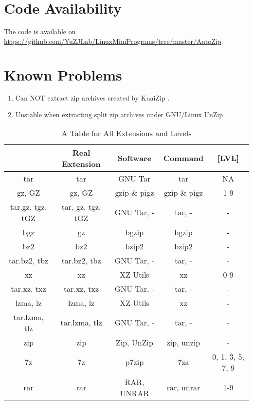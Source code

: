 \documentclass[fleqn,10pt]{SelfArx} %
\begin{document}
\section{Code Availability}
The code is available on \url{https://github.com/YuZJLab/LinuxMiniPrograms/tree/master/AutoZip}.
\section{Known Problems}
\begin{enumerate}
\item Can NOT extract zip archives created by KuaiZip \cite{KuaiZip}.
\item Unstable when extracting split zip archives under GNU/Linux UnZip \cite{UnZip}.
\end{enumerate}


\newpage
\onecolumn
\begin{table}
\centering
\begin{tabular}{|c|c|c|c|c|}
\hline\hline
[EXT] & Real Extension & Software & Command & [LVL] \\\hline\hline
tar & tar & GNU Tar & tar & NA \\\hline
gz, GZ & gz, GZ & gzip \& pigz & gzip \& pigz & 1-9 \\\hline
tar.gz, tgz, tGZ & tar, gz, tgz, tGZ & GNU Tar, - & tar, - & - \\\hline
bgz & gz & bgzip & bgzip & - \\\hline
bz2 & bz2 & bzip2 & bzip2 & - \\\hline
tar.bz2, tbz & tar.bz2, tbz & GNU Tar, - & tar, - & - \\\hline
xz & xz & XZ Utils & xz & 0-9 \\\hline
tar.xz, txz & tar.xz, txz & GNU Tar, - & tar, - & - \\\hline
lzma, lz & lzma, lz & XZ Utils & xz & - \\\hline
tar.lzma, tlz & tar.lzma, tlz & GNU Tar, - & tar, - & - \\\hline
zip & zip & Zip, UnZip & zip, unzip & - \\\hline
7z & 7z & p7zip & 7za & 0, 1, 3, 5, 7, 9 \\\hline
rar & rar & RAR, UNRAR & rar, unrar & 1-9 \\\hline\hline
\end{tabular}
\caption{A Table for All Extensions and Levels}
\label{tbl:AllExt}
\end{table}
\end{document}
